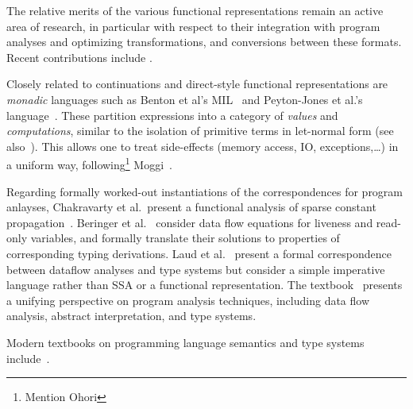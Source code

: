 The relative merits of the various functional representations remain
an active area of research, in particular with respect to their
integration with program analyses and optimizing transformations, and
conversions between these formats. Recent contributions include
\cite{DBLP:journals/jfp/DanvyMN07,DBLP:journals/lisp/Reppy02,DBLP:conf/icfp/Kennedy07}. 

Closely related to continuations and direct-style functional
representations are
\emph{monadic} languages such as Benton et al's MIL~\cite{BentonKennedyRussel:ICFP1998} and  Peyton-Jones et al.'s language~\cite{PeytonJonesShieldsLT:POPL1998}. These partition expressions into a category of \emph{values} and \emph{computations}, similar to the isolation of primitive terms in let-normal form (see also~\cite{Reynolds1974,Plotkin75}). This allows one to treat side-effects (memory access, IO, exceptions,\ldots) in a uniform way, following\footnote{Mention Ohori} Moggi~\cite{Moggi1991}. 

Regarding formally worked-out instantiations of the correspondences
for program anlayses, Chakravarty et al.~present a functional analysis
of sparse constant propagation~\cite{ChakravartyKZ:COCV03}. Beringer
et al.~\cite{DBLP:journals/entcs/BeringerMS03} consider data flow
equations for liveness and read-only variables, and formally translate
their solutions to properties of corresponding typing
derivations. Laud et al.~\cite{DBLP:journals/tcs/LaudUV06} present a
formal correspondence between dataflow analyses and type systems but
consider a simple imperative language rather than SSA or a functional
representation. The textbook~\cite{NielsonNielsonHanking:POPA}
presents a unifying perspective on program analysis techniques,
including data flow analysis, abstract interpretation, and type
systems.

Modern textbooks on programming language semantics and type systems
include~\cite{winskel_93_formal,GunterBook,PierceTAPL}.

%
%
